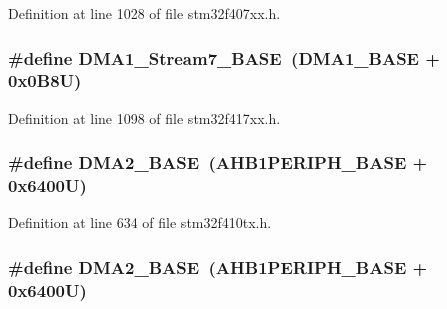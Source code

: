 Definition at line 1028 of file stm32f407xx.\+h.

\subsubsection[{\texorpdfstring{D\+M\+A1\+\_\+\+Stream7\+\_\+\+B\+A\+SE}{DMA1_Stream7_BASE}}]{\setlength{\rightskip}{0pt plus 5cm}\#define D\+M\+A1\+\_\+\+Stream7\+\_\+\+B\+A\+SE~({\bf D\+M\+A1\+\_\+\+B\+A\+SE} + 0x0\+B8\+U)}\hypertarget{group___peripheral__registers__structures_ga82186dd6d3f60995d428b34c041919d7}{}\label{group___peripheral__registers__structures_ga82186dd6d3f60995d428b34c041919d7}


Definition at line 1098 of file stm32f417xx.\+h.

\subsubsection[{\texorpdfstring{D\+M\+A2\+\_\+\+B\+A\+SE}{DMA2_BASE}}]{\setlength{\rightskip}{0pt plus 5cm}\#define D\+M\+A2\+\_\+\+B\+A\+SE~({\bf A\+H\+B1\+P\+E\+R\+I\+P\+H\+\_\+\+B\+A\+SE} + 0x6400\+U)}\hypertarget{group___peripheral__registers__structures_gab72a9ae145053ee13d1d491fb5c1df64}{}\label{group___peripheral__registers__structures_gab72a9ae145053ee13d1d491fb5c1df64}


Definition at line 634 of file stm32f410tx.\+h.

\subsubsection[{\texorpdfstring{D\+M\+A2\+\_\+\+B\+A\+SE}{DMA2_BASE}}]{\setlength{\rightskip}{0pt plus 5cm}\#define D\+M\+A2\+\_\+\+B\+A\+SE~({\bf A\+H\+B1\+P\+E\+R\+I\+P\+H\+\_\+\+B\+A\+SE} + 0x6400\+U)}\hypertarget{group___peripheral__registers__structures_gab72a9ae145053ee13d1d491fb5c1df64}{}\label{group___peripheral__registers__structures_gab72a9ae145053ee13d1d491fb5c1df64}


